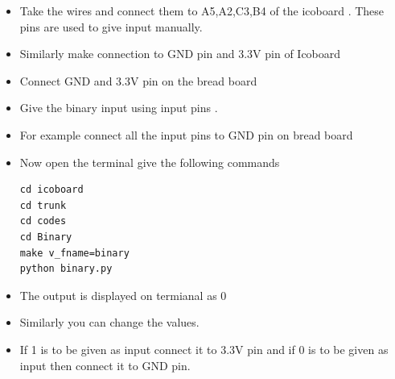 \documentclass[journal,12pt,twocolumn]{IEEEtran}
\begin{document}
\begin{itemize}
\item Take the wires and connect them to A5,A2,C3,B4 of the icoboard . These pins are used to give input manually.\\
\item Similarly make connection to GND pin and 3.3V pin of Icoboard\\
\item Connect GND and 3.3V pin on the bread board\\
\item Give the binary input using input pins .\\
\item For example connect all the input pins to GND pin on bread board\\
\item Now open the terminal give the following commands\\
\begin{lstlisting}
cd icoboard
cd trunk
cd codes
cd Binary
make v_fname=binary
python binary.py
\end{lstlisting} 
\item The output is displayed on termianal as 0\\
\item Similarly you can change the values.
\item  If 1 is to be given as input connect it to 3.3V pin and if 0 is to be given as input then connect it to GND pin.
\end{itemize}
\end{document}
